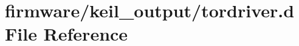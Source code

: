 \hypertarget{tordriver_8d}{\section{firmware/keil\-\_\-output/tordriver.d File Reference}
\label{tordriver_8d}
}
